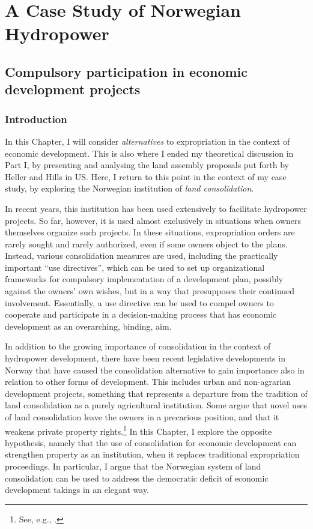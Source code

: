 \part{A Case Study of Norwegian Hydropower}

\chapter{Compulsory participation in economic development projects}\label{chap:6}

\section{Introduction}\label{sec:intro6}

In this Chapter, I will consider {\it alternatives} to expropriation in the context of economic development. This is also where I ended my theoretical discussion in Part I, by presenting and analysing the land assembly proposals put forth by Heller and Hills in US. Here, I return to this point in the context of my case study, by exploring the Norwegian institution of {\it land consolidation}. 

In recent years, this institution has been used extensively to facilitate hydropower projects. So far, however, it is used almost exclusively in situations when owners themselves organize such projects. In these situations, expropriation orders are rarely sought and rarely authorized, even if some owners object to the plans. Instead, various consolidation measures are used, including the practically important ``use directives'', which can be used to set up organizational frameworks for compulsory implementation of a development plan, possibly against the owners' own wishes, but in a way that presupposes their continued involvement. Essentially, a use directive can be used to compel owners to cooperate and participate in a decision-making process that has economic development as an overarching, binding, aim.

In addition to the growing importance of consolidation in the context of hydropower development, there have been recent legislative developments in Norway that have caused the consolidation alternative to gain importance also in relation to other forms of development. This includes urban and non-agrarian development projects, something that represents a departure from the tradition of land consolidation as a purely agricultural institution. Some argue that novel uses of land consolidation leave the owners in a precarious position, and that it weakens private property rights.\footnote{See, e.g., \cite{stenset08}.} In this Chapter, I explore the opposite hypothesis, namely that the use of consolidation for economic development can strengthen property as an institution, when it replaces traditional expropriation proceedings. In particular, I argue that the Norwegian system of land consolidation can be used to address the democratic deficit of economic development takings in an elegant way.  

